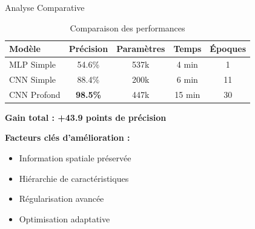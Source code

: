 \documentclass[aspectratio=169]{beamer}
\newcommand{\emphasize}[1]{\textcolor{accent_orange}{\textbf{#1}}}
\begin{document}
\begin{frame}{Analyse Comparative}
    \begin{table}[h]
        \centering
        \begin{tabular}{@{}lcccc@{}}
            \toprule
            \textbf{Modèle} & \textbf{Précision} & \textbf{Paramètres} & \textbf{Temps} & \textbf{Époques} \\
            \midrule
            MLP Simple & \color{red}54.6\% & 537k & 4 min & 1 \\
            CNN Simple & \color{orange}88.4\% & 200k & 6 min & 11 \\
            CNN Profond & \color{tech_green}\textbf{98.5\%} & 447k & 15 min & 30 \\
            \bottomrule
        \end{tabular}
        \caption{Comparaison des performances}
    \end{table}
    
    \vspace{0.3cm}
    \begin{center}
        \emphasize{Gain total : +43.9 points de précision}
    \end{center}
    
    \vspace{0.1cm}
    \textbf{Facteurs clés d'amélioration :}
    \begin{itemize}
        \item Information spatiale préservée
        \item Hiérarchie de caractéristiques
        \item Régularisation avancée
        \item Optimisation adaptative
    \end{itemize}
\end{frame}
\end{document}
